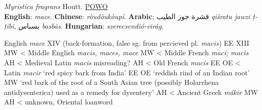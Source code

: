 



\begin{spice}
\textit{Myristica fragrans} Houtt. \hfill \href{https://powo.science.kew.org/taxon/586076-1}{POWO}\\
\textbf{English}: \textit{mace}.
\textbf{Chinese}:  \textit{ròudòukòupí}.
\textbf{Arabic}: قشرة جوز الطيب \textit{qišratu jawzi ṭ-ṭībi}, بسباس \textit{basbās}.
\textbf{Hungarian}: \textit{szerecsendió-virág}.
\end{spice}

\begin{etymology}
English \textit{mace} XIV (back-formation, false sg. from percieved pl. \textit{macis}) EE XIII MW
< Middle English \textit{macis, maces, mace} MW
< Middle French \textit{maci; macis} AH
< Medieval Latin \textit{macis} misreading? AH
< Old French \textit{macis} EE OE
< Latin \textit{macir} `red spicy bark from India' EE OE `reddish rind of an Indian root' MW `red bark of the root of a South Asian tree (possibly Holarrhena antidysenterica) used as a remedy for dysentery' AH
< Ancient Greek \textit{mákir} MW AH
< unknown, Oriental loanword 
\end{etymology}





